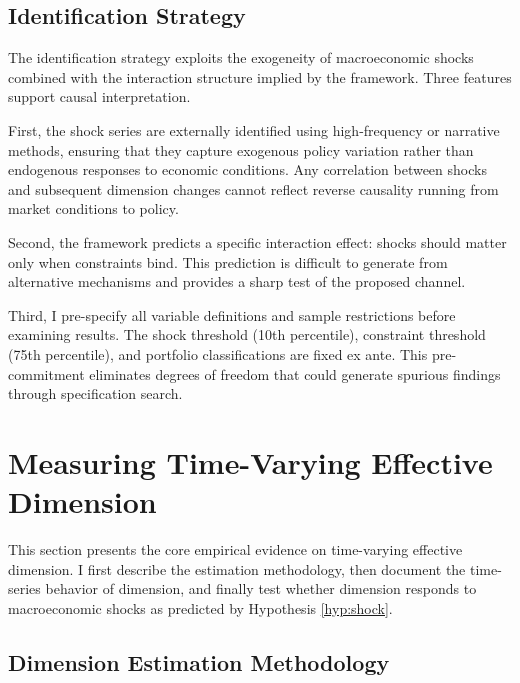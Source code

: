 \documentclass[12pt,letterpaper]{article}
\theoremstyle{plain}
\theoremstyle{definition}
\begin{document}
\subsection{Identification Strategy}\label{subsec:identification}

The identification strategy exploits the exogeneity of macroeconomic shocks combined with the interaction structure implied by the framework. Three features support causal interpretation.

First, the shock series are externally identified using high-frequency or narrative methods, ensuring that they capture exogenous policy variation rather than endogenous responses to economic conditions. Any correlation between shocks and subsequent dimension changes cannot reflect reverse causality running from market conditions to policy.

Second, the framework predicts a specific interaction effect: shocks should matter only when constraints bind. This prediction is difficult to generate from alternative mechanisms and provides a sharp test of the proposed channel.

Third, I pre-specify all variable definitions and sample restrictions before examining results. The shock threshold (10th percentile), constraint threshold (75th percentile), and portfolio classifications are fixed ex ante. This pre-commitment eliminates degrees of freedom that could generate spurious findings through specification search.


\section{Measuring Time-Varying Effective Dimension}\label{sec:dimension}

This section presents the core empirical evidence on time-varying effective dimension. I first describe the estimation methodology, then document the time-series behavior of dimension, and finally test whether dimension responds to macroeconomic shocks as predicted by Hypothesis \ref{hyp:shock}.

\subsection{Dimension Estimation Methodology}\label{subsec:dim_methodology}
\end{document}
